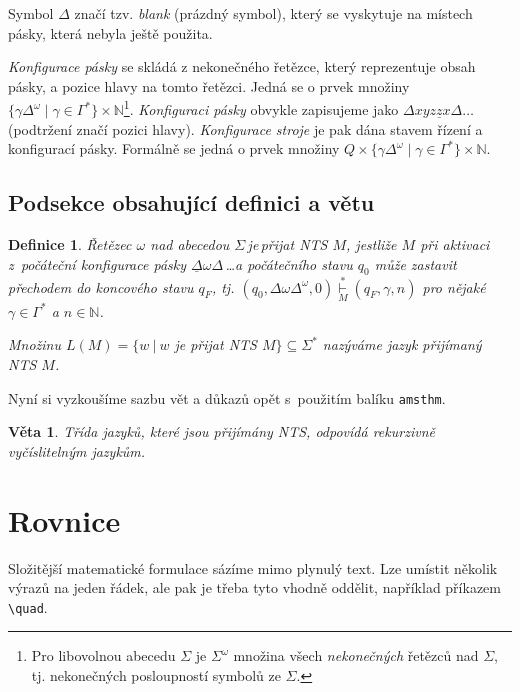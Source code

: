 \documentclass[11pt, twocolumn]{article}
\newtheorem{definition}{Definice}
\newtheorem{sentence}{Věta}
\begin{document}
Symbol $\Delta$ značí tzv. \emph{blank} (prázdný symbol), který se vyskytuje na místech pásky, 
která nebyla ještě použita.

\emph{Konfigurace pásky} se skládá z nekonečného řetězce, který reprezentuje obsah pásky, a pozice
hlavy na tomto řetězci. Jedná se o prvek množiny $\{\gamma\Delta^{\omega}\mid\gamma\in\Gamma^{\ast}\}\times\mathbb{N}$\footnote{Pro libovolnou abecedu $\Sigma$ je $\Sigma^{\omega}$ množina všech \emph{nekonečných} řetězců nad $\Sigma$, tj. nekonečných posloupností symbolů ze $\Sigma$.}.
\emph{Konfiguraci pásky} obvykle zapisujeme jako $\Delta xyz\underline{z}x\Delta\ldots$ (podtržení značí pozici hlavy).
\emph{Konfigurace stroje} je pak dána stavem řízení a konfigurací pásky. Formálně se jedná o prvek množiny
$Q \times \{\gamma \Delta^{\omega} \mid \gamma \in \Gamma^{\ast}\} \times \mathbb{N}$.

\subsection{Podsekce obsahující definici a větu}

\begin{definition}
\label{def:2}
\emph{Řetězec $\omega$ nad abecedou $\Sigma$\,je\,přijat NTS} $M$, jestliže $M$ při aktivaci z~počáteční konfigurace pásky $\underline{\Delta}\omega\Delta$\,\dots a počátečního stavu $q_0$ může zastavit přechodem do koncového stavu $q_F$, tj. $(q_0, \Delta\omega\Delta^{\omega},0) \overset{{\ast}}{\underset{M}{\vdash}} (q_F,\gamma,n)$ pro nějaké $\gamma \in \Gamma^{\ast}$ a $n \in \mathbb{N}$.

Množinu $L(M) = \{w\ |\ w$ je přijat NTS $M\}\subseteq \Sigma^{\ast}$ nazýváme \emph{jazyk přijímaný NTS} $M$.
\end{definition}

Nyní si vyzkoušíme sazbu vět a důkazů opět s~použitím balíku \verb|amsthm|.

\begin{sentence}
Třída jazyků, které jsou přijímány NTS, odpovídá \emph{rekurzivně vyčíslitelným jazykům}.
\end{sentence}


\section{Rovnice}

Složitější matematické formulace sázíme mimo plynulý text. Lze umístit několik výrazů na jeden řádek, ale pak je třeba tyto vhodně oddělit, například příkazem \verb|\quad|.
\end{document}
